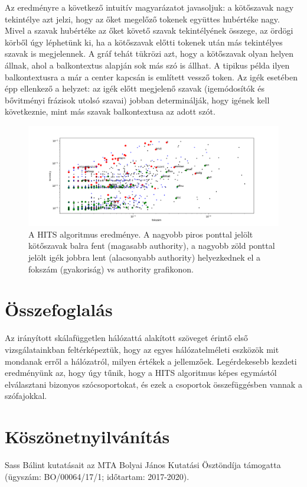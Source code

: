 \documentclass{llncs}
\begin{document}
Az eredményre a következő intuitív magyarázatot javasoljuk: a kötőszavak nagy
tekintélye azt jelzi, hogy az őket megelőző tokenek együttes hubértéke nagy.
Mivel a szavak hubértéke az őket követő szavak tekintélyének összege, az ördögi
körből úgy léphetünk ki, ha a kötőszavak előtti tokenek után más tekintélyes
szavak is megjelennek. A gráf tehát tükrözi azt, hogy a kötőszavak olyan helyen
állnak, ahol a balkontextus alapján sok más szó is állhat. A tipikus példa
ilyen balkontextusra a már a center kapcsán is említett vessző token.
Az igék esetében épp ellenkező a helyzet: az igék előtt megjelenő szavak
(igemódosítók és bővitményi frázisok utolsó szavai) jobban determinálják, hogy
igének kell következnie, mint más szavak balkontextusa az adott szót.

\begin{figure}
\begin{center}
\includegraphics[width=25cm]{conv-verb-auth.png}
\caption{A HITS algoritmus eredménye.
A nagyobb piros ponttal jelölt kötőszavak balra fent
(magasabb authority),
a nagyobb zöld ponttal jelölt igék jobbra lent
(alacsonyabb authority)
helyezkednek el
a fokszám (gyakoriság) vs authority grafikonon.}
\end{center}
\label{fig:hits-auth}
\end{figure}


\section{Összefoglalás}

Az irányított skálafüggetlen hálózattá alakított szöveget
érintő első vizsgálatainkban feltérképeztük,
hogy az egyes hálózatelméleti eszközök
mit mondanak erről a hálózatról, milyen értékek a jellemzőek.
%
Legérdekesebb kezdeti eredményünk az,
hogy úgy tűnik, hogy a HITS algoritmus
képes egymástól elválasztani bizonyos szócsoportokat,
és ezek a csoportok összefüggésben vannak a szófajokkal.



\section*{Köszönetnyilvánítás}
\label{Koszonet}

Sass Bálint kutatásait
az MTA Bolyai János Kutatási Ösztöndíja támogatta
(ügyszám: BO/00064/17/1; időtartam: 2017-2020).


%


\end{document}
